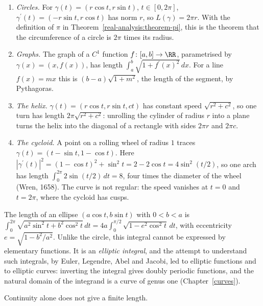 \begin{example}\label{real-analysis:example-lengths}
\begin{enumerate}
\item \emph{Circles.} For $\gamma(t) = (r\cos t, r\sin t)$, $t \in [0, 2\pi]$, $\gamma^{\prime}(t) = (-r\sin t, r\cos t)$ has norm $r$, so $L(\gamma) = 2\pi r$. With the definition of $\pi$ in
Theorem~\ref{real-analysis:theorem-pi}, this is the theorem that the circumference of a circle is $2\pi$ times its radius.
\item \emph{Graphs.} The graph of a $C^1$ function $f \colon [a, b] \to \RR$, parametrised by $\gamma(x) = (x, f(x))$, has length $\int_a^b\sqrt{1 + f^{\prime}(x)^2}\,dx$. For a line $f(x) = mx$ this is
$(b - a)\sqrt{1 + m^2}$, the length of the segment, by Pythagoras.
\item \emph{The helix.} $\gamma(t) = (r\cos t, r\sin t, ct)$ has constant speed $\sqrt{r^2 + c^2}$, so one turn has length $2\pi\sqrt{r^2 + c^2}$: unrolling the cylinder of radius $r$ into a plane turns the helix
into the diagonal of a rectangle with sides $2\pi r$ and $2\pi c$.
\item \emph{The cycloid.} A point on a rolling wheel of radius $1$ traces $\gamma(t) = (t - \sin t, 1 - \cos t)$. Here $|\gamma^{\prime}(t)|^2 = (1 - \cos t)^2 + \sin^2t = 2 - 2\cos t = 4\sin^2(t/2)$, so one arch has length
$\int_0^{2\pi}2\sin(t/2)\,dt = 8$, four times the diameter of the wheel (Wren, 1658). The curve is not regular: the speed vanishes at $t = 0$ and $t = 2\pi$, where the cycloid has cusps.
\end{enumerate}
\end{example}

\begin{remark}\label{real-analysis:remark-elliptic-integrals}
The length of an ellipse $(a\cos t, b\sin t)$ with $0 < b < a$ is $\int_0^{2\pi}\sqrt{a^2\sin^2t + b^2\cos^2t}\,dt = 4a\int_0^{\pi/2}\sqrt{1 - e^2\cos^2t}\,dt$, with eccentricity $e = \sqrt{1 - b^2/a^2}$. Unlike
the circle, this integral cannot be expressed by elementary functions. It is an \emph{elliptic integral}, and the attempt to understand such integrals, by Euler, Legendre, Abel and Jacobi, led to elliptic
functions and to elliptic curves: inverting the integral gives doubly periodic functions, and the natural domain of the integrand is a curve of genus one (Chapter~\ref{curves}).
\end{remark}

Continuity alone does not give a finite length.

